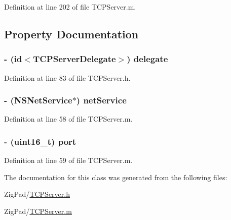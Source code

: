 Definition at line 202 of file TCPServer.m.



\subsection{Property Documentation}
\hypertarget{interface_t_c_p_server_a13a8a34ddb4e3e1d8175da5cbb575b94}{
\subsubsection[{delegate}]{\setlength{\rightskip}{0pt plus 5cm}-\/ (id$<${\bf TCPServerDelegate}$>$) delegate}}
\label{interface_t_c_p_server_a13a8a34ddb4e3e1d8175da5cbb575b94}


Definition at line 83 of file TCPServer.h.

\hypertarget{interface_t_c_p_server_a36376bb50bc0e6bba06d8508dd3bc61b}{
\subsubsection[{netService}]{\setlength{\rightskip}{0pt plus 5cm}-\/ (NSNetService$\ast$) netService}}
\label{interface_t_c_p_server_a36376bb50bc0e6bba06d8508dd3bc61b}


Definition at line 58 of file TCPServer.m.

\hypertarget{interface_t_c_p_server_a8e0798404bf2cf5dabb84c5ba9a4f236}{
\subsubsection[{port}]{\setlength{\rightskip}{0pt plus 5cm}-\/ (uint16\_\-t) port}}
\label{interface_t_c_p_server_a8e0798404bf2cf5dabb84c5ba9a4f236}


Definition at line 59 of file TCPServer.m.



The documentation for this class was generated from the following files:\begin{DoxyCompactItemize}
\item 
ZigPad/\hyperlink{_t_c_p_server_8h}{TCPServer.h}\item 
ZigPad/\hyperlink{_t_c_p_server_8m}{TCPServer.m}\end{DoxyCompactItemize}
